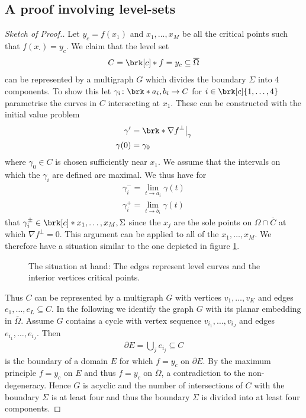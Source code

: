 \subsection{A proof involving level-sets}

\begin{proof}[Sketch of Proof.]
  Let $y_c=f(x_1)$ and $x_1,\dots,x_M$ be all the critical points such that $f(x_\cdot)=y_c$.
  We claim that the level set
  \begin{align*}
    C=\brk[c]*{f=y_c}\subseteq\overline{\Omega}
  \end{align*}
  can be represented by a multigraph $G$
  which divides the boundary $\Sigma$ into 4 components. To show this let $\gamma_i\colon \brk*{a_i,b_i}\to C$ for $i\in\brk[c]{1,\dots,4}$ parametrise the curves in
  $C$ intersecting at $x_1$. These can be constructed with the initial value problem
  \begin{align*} 
    \gamma'&=\brk*{\nabla f}^\perp\big\vert_\gamma \\
    \gamma(0) &= \gamma_0
  \end{align*}
  where $\gamma_0\in C$ is chosen sufficiently near $x_1$. We assume that the intervals on which the $\gamma_i$ are
  defined are maximal. We thus have for
  \begin{align*}
    \gamma_i^-=\lim_{t\to a_i}\gamma(t) \\
    \gamma_i^+=\lim_{t\to b_i}\gamma(t)
  \end{align*}
  that $\gamma_i^\pm\in\brk[c]*{x_1,\dots,x_M,\Sigma}$ since the $x_j$ are the sole points on $\Omega\cap\overline{C}$
  at which $\nabla f^\perp=0$. This argument can be applied to all of the 
  $x_1,\dots,x_M$. We therefore have a situation similar to the one depicted in figure \ref{fi:n2:levelSets:overview}.
  
  \begin{figure}
    \centering
    \def\svgwidth{0.8\textwidth}
    
    \caption{The situation at hand: The edges represent level curves and the interior vertices critical points.}
    \label{fi:n2:levelSets:overview}
  \end{figure}

  Thus $C$ can be represented by a multigraph $G$ with vertices $v_1,\dots,v_K$ and edges $e_1,\dots,e_L\subseteq C$.
  In the following we identify the graph $G$ with its planar embedding in $\overline{\Omega}$.
  Assume $G$ contains a cycle with vertex sequence $v_{i_1},\dots,v_{i_J}$ and edges $e_{i_1},\dots,e_{i_J}$. Then
  \begin{align*}
    \partial E = \bigcup_j e_{i_j}\subseteq C
  \end{align*}
  is the boundary of a domain $E$ for which $f=y_c$ on $\partial E$. By the maximum principle $f=y_c$ on $E$ and thus
  $f=y_c$ on $\overline{\Omega}$, a contradiction to the non-degeneracy. Hence $G$ is acyclic and the number of 
  intersections of $C$ with the boundary $\Sigma$ is at least four and thus the boundary $\Sigma$ is divided into at least four components.
  

\end{proof}
